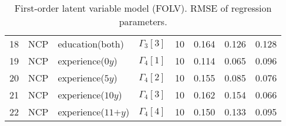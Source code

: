 \begin{table}[H]
\begin{tabular}{rlllrrrr}
		18 & NCP & \footnotesize{education(both)} & $\Gamma_{3}[3]$ &   10 & 0.164 & 0.126 & 0.128 \\ 
		19 & NCP & \footnotesize{experience($0y$)} & $\Gamma_{4}[1]$ &   10 & 0.114 & 0.065 & 0.096 \\ 
		20 & NCP & \footnotesize{experience($5y$)} & $\Gamma_{4}[2]$ &   10 & 0.155 & 0.085 & 0.076 \\ 
		21 & NCP & \footnotesize{experience($10y$)} & $\Gamma_{4}[3]$ &   10 & 0.162 & 0.154 & 0.066 \\ 
		22 & NCP & \footnotesize{experience($11\text{+}y$)} & $\Gamma_{4}[4]$ &   10 & 0.150 & 0.133 & 0.095 \\ 
		\hline
	\end{tabular}
	\caption[First-order latent variable model (FOLV). RMSE of regression parameters.]%
	{First-order latent variable model (FOLV). RMSE of regression parameters.} 
	\label{tab:FOLV_RMSE_regression}
\end{table}

